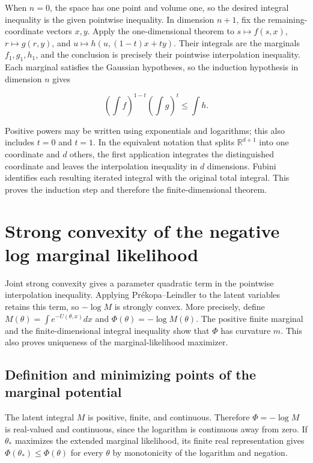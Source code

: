 \documentclass[11pt,a4paper]{article}
\begin{document}
When \(n=0\), the space has one point and volume one, so the desired integral inequality is the given pointwise inequality. In dimension \(n+1\), fix the remaining-coordinate vectors \(x,y\). Apply the one-dimensional theorem to \(s\mapsto f(s,x)\), \(r\mapsto g(r,y)\), and \(u\mapsto h(u,(1-t)x+ty)\). Their integrals are the marginals \(f_1,g_1,h_1\), and the conclusion is precisely their pointwise interpolation inequality. Each marginal satisfies the Gaussian hypotheses, so the induction hypothesis in dimension \(n\) gives

\[\left(\int f\right)^{1-t}\left(\int g\right)^t\le\int h.\]

Positive powers may be written using exponentials and logarithms; this also includes \(t=0\) and \(t=1\). In the equivalent notation that splits \(\mathbb R^{d+1}\) into one coordinate and \(d\) others, the first application integrates the distinguished coordinate and leaves the interpolation inequality in \(d\) dimensions. Fubini identifies each resulting iterated integral with the original total integral. This proves the induction step and therefore the finite-dimensional theorem.



\section{\texorpdfstring{Strong convexity of the negative log marginal likelihood}{Strong convexity of the negative log marginal likelihood}}


Joint strong convexity gives a parameter quadratic term in the pointwise interpolation inequality. Applying Prékopa–Leindler to the latent variables retains this term, so \(-\log M\) is strongly convex. More precisely, define \(M(\theta)=\int e^{-U(\theta,x)}dx\) and \(\Phi(\theta)=-\log M(\theta)\). The positive finite marginal and the finite-dimensional integral inequality show that \(\Phi\) has curvature \(m\). This also proves uniqueness of the marginal-likelihood maximizer.


\subsection{\texorpdfstring{Definition and minimizing points of the marginal potential}{Definition and minimizing points of the marginal potential}}


The latent integral \(M\) is positive, finite, and continuous. Therefore \(\Phi=-\log M\) is real-valued and continuous, since the logarithm is continuous away from zero. If \(\theta_*\) maximizes the extended marginal likelihood, its finite real representation gives \(\Phi(\theta_*)\le\Phi(\theta)\) for every \(\theta\) by monotonicity of the logarithm and negation.
\end{document}
